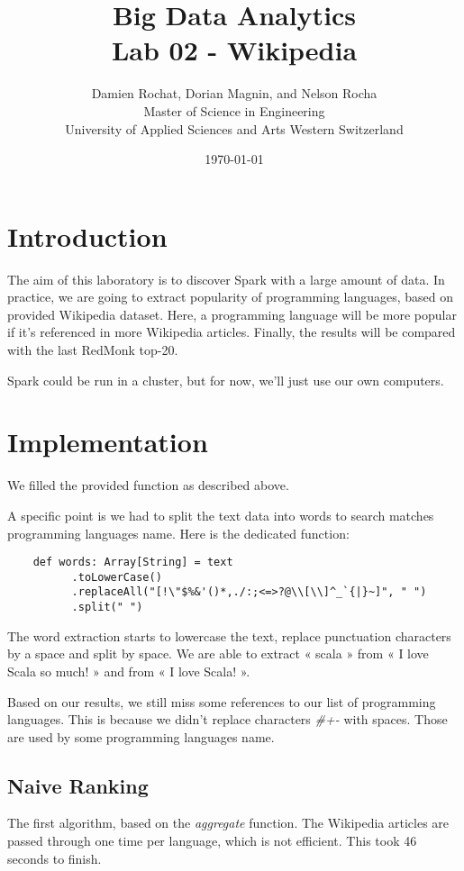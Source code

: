 \documentclass[a4paper]{article}
\title{
	Big Data Analytics \\
	Lab 02 - Wikipedia}
\author{
	Damien Rochat, Dorian Magnin, and Nelson Rocha \\
	Master of Science in Engineering \\
	University of Applied Sciences and Arts Western Switzerland}
\date{\today}
\begin{document}
	\maketitle
	
	\section{Introduction}
	The aim of this laboratory is to discover Spark with a large amount of data.
	In practice, we are going to extract popularity of programming languages,
	based on provided Wikipedia dataset.
	Here, a programming language will be more popular if it's referenced in more Wikipedia articles.
	Finally, the results will be compared with the last RedMonk top-20.

	Spark could be run in a cluster, but for now, we'll just use our own computers.

	\section{Implementation}
	We filled the provided function as described above.

	A specific point is we had to split the text data into words to search matches programming languages name.
	Here is the dedicated function:

	\begin{verbatim}
	def words: Array[String] = text
		  .toLowerCase()
		  .replaceAll("[!\"$%&'()*,./:;<=>?@\\[\\]^_`{|}~]", " ")
		  .split(" ")
	\end{verbatim}

	The word extraction starts to lowercase the text, replace punctuation characters by a space and split by space.
	We are able to extract « scala » from « I love Scala so much! » and from « I love Scala! ».

	Based on our results, we still miss some references to our list of programming languages.
	This is because we didn't replace characters \textit{\#+-} with spaces.
	Those are used by some programming languages name.

	\subsection{Naive Ranking}
	The first algorithm, based on the \textit{aggregate} function.
	The Wikipedia articles are passed through one time per language, which is not efficient.
	This took 46 seconds to finish.
\end{document}
